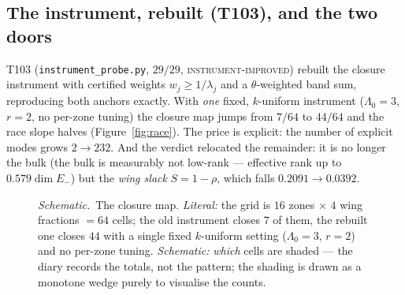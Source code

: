 \documentclass[11pt,a4paper]{article}
\newcommand{\schem}{\textit{Schematic.}\ }
\begin{document}
\subsection{The instrument, rebuilt (T103), and the two doors}
T103 (\texttt{instrument\_probe.py}, $29/29$, \textsc{instrument-improved}) rebuilt the closure
instrument with certified weights $w_j\ge1/\lambda_j$ and a $\theta$-weighted band sum, reproducing both
anchors exactly. With \emph{one} fixed, $k$-uniform instrument ($\Lambda_0=3$, $r=2$, no per-zone
tuning) the closure map jumps from $7/64$ to $44/64$ and the race slope halves
(Figure~\ref{fig:race}). The price is explicit: the number of explicit modes grows $2\to232$.
And the verdict relocated the remainder: it is no longer the bulk (the bulk is measurably not
low-rank --- effective rank up to $0.579\dim E_-$) but the \emph{wing slack} $S=1-\rho$, which falls
$0.2091\to0.0392$.

\begin{figure}[ht]\centering
{}
\caption{\schem The closure map. \emph{Literal:} the grid is $16$ zones $\times$ $4$ wing fractions
$=64$ cells; the old instrument closes $7$ of them, the rebuilt one closes $44$ with a single fixed
$k$-uniform setting ($\Lambda_0=3$, $r=2$) and no per-zone tuning. \emph{Schematic:} \emph{which} cells
are shaded --- the diary records the totals, not the pattern; the shading is drawn as a monotone wedge
purely to visualise the counts.}\label{fig:closuremap}
\end{figure}
\end{document}
